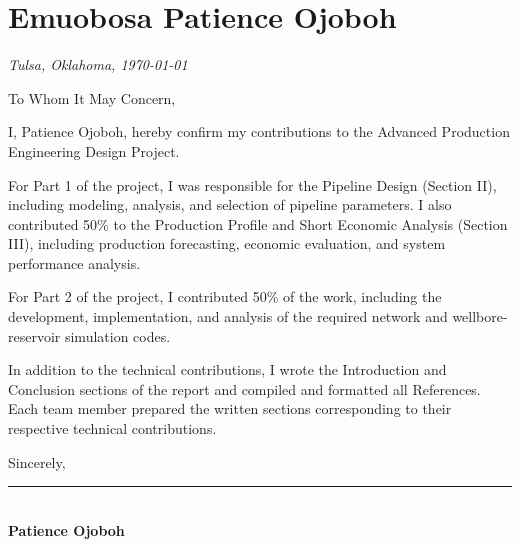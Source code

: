 \newpage

\section*{Emuobosa Patience Ojoboh}

\noindent
\textit{Tulsa, Oklahoma, \today}

\vspace{0.5em}
\noindent
To Whom It May Concern,

\vspace{0.5em}
\noindent
I, Patience Ojoboh, hereby confirm my contributions to the Advanced Production Engineering Design Project.

For Part 1 of the project, I was responsible for the Pipeline Design (Section II), including modeling, analysis, and selection of pipeline parameters. I also contributed 50\% to the Production Profile and Short Economic Analysis (Section III), including production forecasting, economic evaluation, and system performance analysis.

For Part 2 of the project, I contributed 50\% of the work, including the development, implementation, and analysis of the required network and wellbore-reservoir simulation codes.

In addition to the technical contributions, I wrote the Introduction and Conclusion sections of the report and compiled and formatted all References. Each team member prepared the written sections corresponding to their respective technical contributions.

\vspace{1em}
\noindent
Sincerely,\\[1.5em]
\rule{6cm}{0.4pt}\\
\textbf{Patience Ojoboh}

\newpage